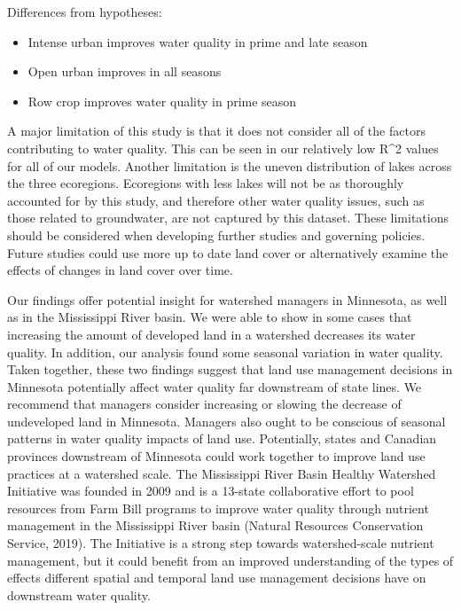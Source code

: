 \documentclass[12pt,]{article}
\providecommand{\tightlist}{%
  \setlength{\itemsep}{0pt}\setlength{\parskip}{0pt}}
\begin{document}
Differences from hypotheses:

\begin{itemize}
\tightlist
\item
  Intense urban improves water quality in prime and late season
\item
  Open urban improves in all seasons
\item
  Row crop improves water quality in prime season
\end{itemize}

A major limitation of this study is that it does not consider all of the
factors contributing to water quality. This can be seen in our
relatively low R\^{}2 values for all of our models. Another limitation
is the uneven distribution of lakes across the three ecoregions.
Ecoregions with less lakes will not be as thoroughly accounted for by
this study, and therefore other water quality issues, such as those
related to groundwater, are not captured by this dataset. These
limitations should be considered when developing further studies and
governing policies. Future studies could use more up to date land cover
or alternatively examine the effects of changes in land cover over time.

Our findings offer potential insight for watershed managers in
Minnesota, as well as in the Mississippi River basin. We were able to
show in some cases that increasing the amount of developed land in a
watershed decreases its water quality. In addition, our analysis found
some seasonal variation in water quality. Taken together, these two
findings suggest that land use management decisions in Minnesota
potentially affect water quality far downstream of state lines. We
recommend that managers consider increasing or slowing the decrease of
undeveloped land in Minnesota. Managers also ought to be conscious of
seasonal patterns in water quality impacts of land use. Potentially,
states and Canadian provinces downstream of Minnesota could work
together to improve land use practices at a watershed scale. The
Mississippi River Basin Healthy Watershed Initiative was founded in 2009
and is a 13-state collaborative effort to pool resources from Farm Bill
programs to improve water quality through nutrient management in the
Mississippi River basin (Natural Resources Conservation Service, 2019).
The Initiative is a strong step towards watershed-scale nutrient
management, but it could benefit from an improved understanding of the
types of effects different spatial and temporal land use management
decisions have on downstream water quality.
\end{document}
